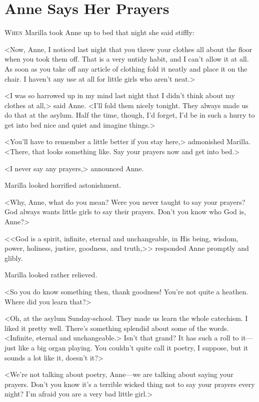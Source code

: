 \chapter{Anne Says Her Prayers}

\lettrine{W}{hen} Marilla took Anne up to bed that night she said stiffly:

\zz
<Now, Anne, I noticed last night that you threw your clothes all about the floor when you took them off. That is a very untidy habit, and I can't allow it at all. As soon as you take off any article of clothing fold it neatly and place it on the chair. I haven't any use at all for little girls who aren't neat.>

<I was so harrowed up in my mind last night that I didn't think about my clothes at all,> said Anne. <I'll fold them nicely tonight. They always made us do that at the asylum. Half the time, though, I'd forget, I'd be in such a hurry to get into bed nice and quiet and imagine things.>

<You'll have to remember a little better if you stay here,> admonished Marilla. <There, that looks something like. Say your prayers now and get into bed.>

<I never say any prayers,> announced Anne.

Marilla looked horrified astonishment.

<Why, Anne, what do you mean? Were you never taught to say your prayers? God always wants little girls to say their prayers. Don't you know who God is, Anne?>

<<God is a spirit, infinite, eternal and unchangeable, in His being, wisdom, power, holiness, justice, goodness, and truth,>> responded Anne promptly and glibly.

Marilla looked rather relieved.

<So you do know something then, thank goodness! You're not quite a heathen. Where did you learn that?>

<Oh, at the asylum Sunday-school. They made us learn the whole catechism. I liked it pretty well. There's something splendid about some of the words. <Infinite, eternal and unchangeable.> Isn't that grand? It has such a roll to it—just like a big organ playing. You couldn't quite call it poetry, I suppose, but it sounds a lot like it, doesn't it?>

<We're not talking about poetry, Anne—we are talking about saying your prayers. Don't you know it's a terrible wicked thing not to say your prayers every night? I'm afraid you are a very bad little girl.>


